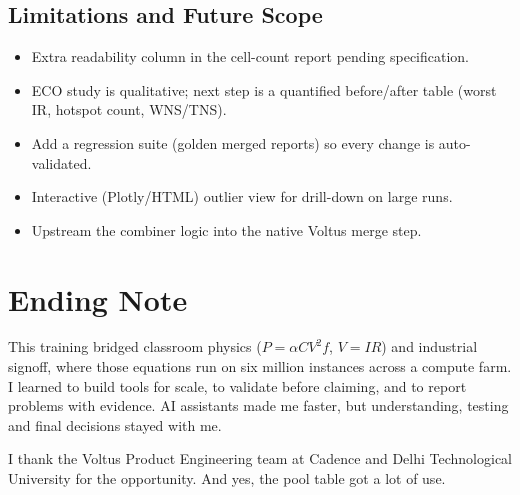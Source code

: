 \documentclass[11pt,a4paper]{article}
\begin{document}
\subsection{Limitations and Future Scope}
\begin{itemize}
  \item Extra readability column in the cell-count report pending specification.
  \item ECO study is qualitative; next step is a quantified before/after table
        (worst IR, hotspot count, WNS/TNS).
  \item Add a regression suite (golden merged reports) so every change is auto-validated.
  \item Interactive (Plotly/HTML) outlier view for drill-down on large runs.
  \item Upstream the combiner logic into the native Voltus merge step.
\end{itemize}

\section{Ending Note}
This training bridged classroom physics ($P=\alpha CV^2f$, $V=IR$) and industrial signoff,
where those equations run on six million instances across a compute farm. I learned to build
tools for scale, to validate before claiming, and to report problems with evidence. AI
assistants made me faster, but understanding, testing and final decisions stayed with me.

I thank the Voltus Product Engineering team at Cadence and Delhi Technological University for
the opportunity. And yes, the pool table got a lot of use.

\end{document}
